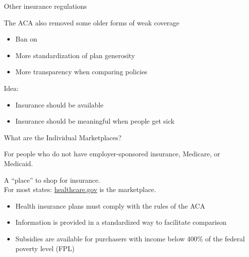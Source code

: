 \begin{frame}{Other insurance regulations}

    The ACA also removed some older forms of weak coverage
    \begin{itemize}
        \item Ban on 
        \item More standardization of plan generosity
        \item More transparency when comparing policies
    \end{itemize}

    \vspace{3mm}

    Idea:
    \begin{itemize}
        \item Insurance should be available
        \item Insurance should be meaningful when people get sick
    \end{itemize}

\end{frame}
\begin{frame}{What are the Individual Marketplaces?}

     For people who do not have employer-sponsored insurance, Medicare, or Medicaid.\\
    \vspace{5mm}

     A ``place'' to shop for insurance.\\
    For most states: \href{https://www.healthcare.gov/}{healthcare.gov} is the marketplace.
    \begin{itemize}
        \item Health insurance plans must comply with the rules of the ACA
        \item Information is provided in a standardized way to facilitate comparison
        \item Subsidies are available for purchasers with income below 400\% of the federal poverty level (FPL)
    \end{itemize}
\end{frame}
